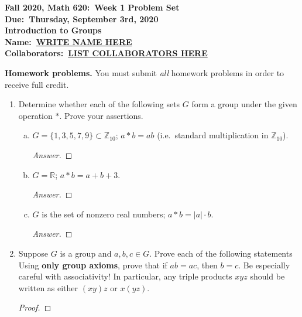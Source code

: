 \documentclass{article}
\theoremstyle{definition}
\numberwithin{equation}{section}
\newcommand{\ring}[1]{\ensuremath{\mathbb{#1}}}
\renewcommand\>{\rangle}
\newcommand\<{\langle}
\newcommand\0{\mathbf{0}}
\newcommand\RR{\ring{R}}
\newcommand\ZZ{\ring{Z}}
\begin{document}
\begin{center}
\textbf{Fall 2020, Math 620:\ Week 1 Problem Set} \\
\textbf{Due:\ Thursday, September 3rd, 2020} \\
\textbf{Introduction to Groups} \\
\textbf{Name:\ \underline{WRITE NAME HERE}} \\
\textbf{Collaborators:\ \underline{LIST COLLABORATORS HERE}}
\end{center}


\bigskip
\noindent
\textbf{Homework problems.}
You must submit \emph{all} homework problems in order to receive full credit.  

\begin{enumerate}[(H1)]
\item 
Determine whether each of the following sets $G$ form a group under the given operation $*$.  Prove your assertions.  

\begin{enumerate}[(a)]
\item 
$G = \{1, 3, 5, 7, 9\} \subset \ZZ_{10}$; $a * b = ab$ (i.e.\ standard multiplication in $\ZZ_{10}$).  

\begin{proof}[Answer]

\end{proof}


\item 
$G = \RR$; $a * b = a + b + 3$.  

\begin{proof}[Answer]

\end{proof}


\item 
$G$ is the set of nonzero real numbers; $a * b = |a| \cdot b$.  

\begin{proof}[Answer]

\end{proof}

\end{enumerate}


\item 
Suppose $G$ is a group and $a, b, c \in G$.  Prove each of the following statements 
Using \textbf{only group axioms}, prove that if $ab = ac$, then $b = c$.  Be especially careful with associativity!  In particular, any triple products $xyz$ should be written as either $(xy)z$ or $x(yz)$.  

\begin{proof}


\end{proof}
\end{enumerate}
\end{document}
